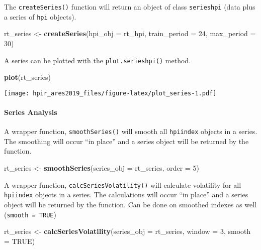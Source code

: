 \documentclass[]{article}
\newenvironment{Shaded}{\begin{snugshade}}{\end{snugshade}}
\newcommand{\DataTypeTok}[1]{\textcolor[rgb]{0.13,0.29,0.53}{#1}}
\newcommand{\DecValTok}[1]{\textcolor[rgb]{0.00,0.00,0.81}{#1}}
\newcommand{\KeywordTok}[1]{\textcolor[rgb]{0.13,0.29,0.53}{\textbf{#1}}}
\newcommand{\NormalTok}[1]{#1}
\newcommand{\OtherTok}[1]{\textcolor[rgb]{0.56,0.35,0.01}{#1}}
\newcommand{\StringTok}[1]{\textcolor[rgb]{0.31,0.60,0.02}{#1}}
\let\oldparagraph\paragraph
\renewcommand{\paragraph}[1]{\oldparagraph{#1}\mbox{}}
\begin{document}
The \texttt{createSeries()} function will return an object of class
\texttt{serieshpi} (data plus a series of \texttt{hpi} objects).

\begin{Shaded}
\begin{Highlighting}[]
\NormalTok{   rt_series <-}\StringTok{ }\KeywordTok{createSeries}\NormalTok{(}\DataTypeTok{hpi_obj =}\NormalTok{ rt_hpi,}
                             \DataTypeTok{train_period =} \DecValTok{24}\NormalTok{,}
                             \DataTypeTok{max_period =} \DecValTok{30}\NormalTok{)}
\end{Highlighting}
\end{Shaded}

A series can be plotted with the \texttt{plot.serieshpi()} method.

\begin{Shaded}
\begin{Highlighting}[]
  \KeywordTok{plot}\NormalTok{(rt_series)}
\end{Highlighting}
\end{Shaded}

\texttt{[image: hpir\_ares2019\_files/figure-latex/plot\_series-1.pdf]}

\hypertarget{series-analysis}{%
\paragraph{Series Analysis}\label{series-analysis}}

A wrapper function, \texttt{smoothSeries()} will smooth all
\texttt{hpiindex} objects in a series. The smoothing will occur ``in
place'' and a series object will be returned by the function.

\begin{Shaded}
\begin{Highlighting}[]
\NormalTok{  rt_series <-}\StringTok{ }\KeywordTok{smoothSeries}\NormalTok{(}\DataTypeTok{series_obj =}\NormalTok{ rt_series,}
                             \DataTypeTok{order =} \DecValTok{5}\NormalTok{)}
\end{Highlighting}
\end{Shaded}

A wrapper function, \texttt{calcSeriesVolatility()} will calculate
volatility for all \texttt{hpiindex} objects in a series. The
calculations will occur ``in place'' and a series object will be
returned by the function. Can be done on smoothed indexes as well
(\texttt{smooth\ =\ TRUE})

\begin{Shaded}
\begin{Highlighting}[]
\NormalTok{  rt_series <-}\StringTok{ }\KeywordTok{calcSeriesVolatility}\NormalTok{(}\DataTypeTok{series_obj =}\NormalTok{ rt_series,}
                                    \DataTypeTok{window =} \DecValTok{3}\NormalTok{,}
                                    \DataTypeTok{smooth =} \OtherTok{TRUE}\NormalTok{)}
  
\end{Highlighting}
\end{Shaded}
\end{document}
